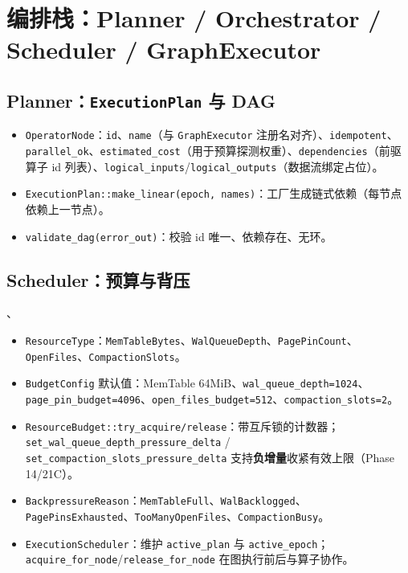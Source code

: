 \section{编排栈：Planner / Orchestrator / Scheduler / GraphExecutor}
\label{sec:mod-orchestration}

\subsection{Planner：\texttt{ExecutionPlan} 与 DAG}


\begin{itemize}
  \item \texttt{OperatorNode}：\texttt{id}、\texttt{name}（与 \texttt{GraphExecutor} 注册名对齐）、\texttt{idempotent}、\texttt{parallel\_ok}、\texttt{estimated\_cost}（用于预算探测权重）、\texttt{dependencies}（前驱算子 id 列表）、\texttt{logical\_inputs}/\texttt{logical\_outputs}（数据流绑定占位）。
  \item \texttt{ExecutionPlan::make\_linear(epoch, names)}：工厂生成链式依赖（每节点依赖上一节点）。
  \item \texttt{validate\_dag(error\_out)}：校验 id 唯一、依赖存在、无环。
\end{itemize}

\subsection{Scheduler：预算与背压}

、

\begin{itemize}
  \item \texttt{ResourceType}：\texttt{MemTableBytes}、\texttt{WalQueueDepth}、\texttt{PagePinCount}、\texttt{OpenFiles}、\texttt{CompactionSlots}。
  \item \texttt{BudgetConfig} 默认值：MemTable 64MiB、\texttt{wal\_queue\_depth=1024}、\texttt{page\_pin\_budget=4096}、\texttt{open\_files\_budget=512}、\texttt{compaction\_slots=2}。
  \item \texttt{ResourceBudget::try\_acquire/release}：带互斥锁的计数器；\texttt{set\_wal\_queue\_depth\_pressure\_delta} / \texttt{set\_compaction\_slots\_pressure\_delta} 支持\textbf{负增量}收紧有效上限（Phase 14/21C）。
  \item \texttt{BackpressureReason}：\texttt{MemTableFull}、\texttt{WalBacklogged}、\texttt{PagePinsExhausted}、\texttt{TooManyOpenFiles}、\texttt{CompactionBusy}。
  \item \texttt{ExecutionScheduler}：维护 \texttt{active\_plan} 与 \texttt{active\_epoch}；\texttt{acquire\_for\_node}/\texttt{release\_for\_node} 在图执行前后与算子协作。
\end{itemize}

